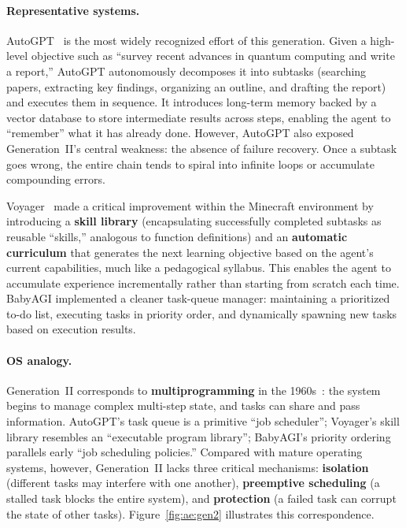 \paragraph{Representative systems.}
AutoGPT~\cite{autogpt_repo_2026} is the most widely recognized effort of this generation.
Given a high-level objective such as ``survey recent advances in quantum computing and write a report,'' AutoGPT autonomously decomposes it into subtasks (searching papers, extracting key findings, organizing an outline, and drafting the report) and executes them in sequence.
It introduces long-term memory backed by a vector database to store intermediate results across steps, enabling the agent to ``remember'' what it has already done.
However, AutoGPT also exposed Generation~II's central weakness: the absence of failure recovery.
Once a subtask goes wrong, the entire chain tends to spiral into infinite loops or accumulate compounding errors.

Voyager~\cite{wang2023voyager} made a critical improvement within the Minecraft environment by introducing a \textbf{skill library} (encapsulating successfully completed subtasks as reusable ``skills,'' analogous to function definitions) and an \textbf{automatic curriculum} that generates the next learning objective based on the agent's current capabilities, much like a pedagogical syllabus.
This enables the agent to accumulate experience incrementally rather than starting from scratch each time.
BabyAGI implemented a cleaner task-queue manager: maintaining a prioritized to-do list, executing tasks in priority order, and dynamically spawning new tasks based on execution results.

\paragraph{OS analogy.}
Generation~II corresponds to \textbf{multiprogramming} in the 1960s~\cite{ostep_2023}: the system begins to manage complex multi-step state, and tasks can share and pass information.
AutoGPT's task queue is a primitive ``job scheduler''; Voyager's skill library resembles an ``executable program library''; BabyAGI's priority ordering parallels early ``job scheduling policies.''
Compared with mature operating systems, however, Generation~II lacks three critical mechanisms: \textbf{isolation} (different tasks may interfere with one another), \textbf{preemptive scheduling} (a stalled task blocks the entire system), and \textbf{protection} (a failed task can corrupt the state of other tasks).
Figure~\ref{fig:ae:gen2} illustrates this correspondence.


